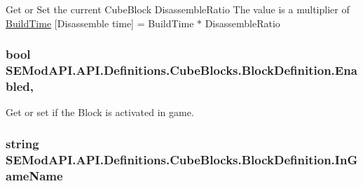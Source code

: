 Get or Set the current Cube\+Block Disassemble\+Ratio The value is a multiplier of \hyperlink{class_s_e_mod_a_p_i_1_1_a_p_i_1_1_definitions_1_1_cube_blocks_1_1_block_definition_a3ad3c26078f99bfd3cb40e3aa2e39051}{Build\+Time} \mbox{[}Disassemble time\mbox{]} = Build\+Time $\ast$ Disassemble\+Ratio 

\hypertarget{class_s_e_mod_a_p_i_1_1_a_p_i_1_1_definitions_1_1_cube_blocks_1_1_block_definition_a73344206bae33fd828c50d9fdb35e621}{}
\subsubsection[{Enabled}]{\setlength{\rightskip}{0pt plus 5cm}bool S\+E\+Mod\+A\+P\+I.\+A\+P\+I.\+Definitions.\+Cube\+Blocks.\+Block\+Definition.\+Enabled\hspace{0.3cm}{\ttfamily [get]}, {\ttfamily [set]}}\label{class_s_e_mod_a_p_i_1_1_a_p_i_1_1_definitions_1_1_cube_blocks_1_1_block_definition_a73344206bae33fd828c50d9fdb35e621}


Get or set if the Block is activated in game. 

\hypertarget{class_s_e_mod_a_p_i_1_1_a_p_i_1_1_definitions_1_1_cube_blocks_1_1_block_definition_ac61c54e96ed85b12c8ac4320aea11023}{}
\subsubsection[{In\+Game\+Name}]{\setlength{\rightskip}{0pt plus 5cm}string S\+E\+Mod\+A\+P\+I.\+A\+P\+I.\+Definitions.\+Cube\+Blocks.\+Block\+Definition.\+In\+Game\+Name\hspace{0.3cm}{\ttfamily [get]}}\label{class_s_e_mod_a_p_i_1_1_a_p_i_1_1_definitions_1_1_cube_blocks_1_1_block_definition_ac61c54e96ed85b12c8ac4320aea11023}


